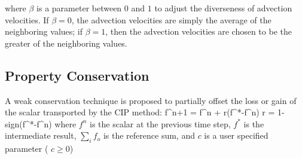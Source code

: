 \noindent where $\beta$ is a parameter between $0$ and $1$ to adjust the diverseness of advection velocities. If $\beta = 0$, the advection velocities are simply the average of the neighboring values; if $\beta = 1$, then the advection velocities are chosen to be the greater of the neighboring values.

\subsection*{Property Conservation}

A weak conservation technique is proposed to partially offset the loss or gain of the scalar transported by the CIP method:
\be
f^{n+1} = f^{n} + r(f^{*}-f^{n})
\ee
\be
r =  1-sign(f^{*}-f^{n})
\ee
where $f^{n}$ is the scalar at the previous time step, $f^*$ is the intermediate result, $\sum_i f_o$ is the reference sum, and $c$ is a user specified parameter ( $c\geq 0$)























